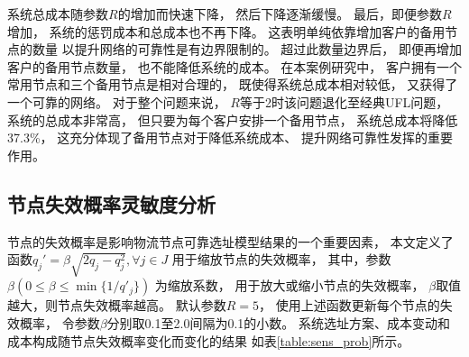   
系统总成本随参数$R$的增加而快速下降，
然后下降逐渐缓慢。
最后，即便参数$R$增加，
系统的惩罚成本和总成本也不再下降。
这表明单纯依靠增加客户的备用节点的数量
以提升网络的可靠性是有边界限制的。
超过此数量边界后，
即便再增加客户的备用节点数量，
也不能降低系统的成本。
在本案例研究中，
客户拥有一个常用节点和三个备用节点是相对合理的，
既使得系统总成本相对较低，
又获得了一个可靠的网络。
对于整个问题来说，
$R$等于2时该问题退化至经典UFL问题，
系统的总成本非常高，
但只要为每个客户安排一个备用节点，
系统总成本将降低37.3\%，
这充分体现了备用节点对于降低系统成本、
提升网络可靠性发挥的重要作用。


\subsection{节点失效概率灵敏度分析}
节点的失效概率是影响物流节点可靠选址模型结果的一个重要因素，
本文定义了函数$q_j' = \beta \sqrt{2q_j - q_j^2},\forall j \in J $
用于缩放节点的失效概率，
其中，参数$\beta (0 \le \beta \le \min \{ 1/q'_j \})$
为缩放系数，
用于放大或缩小节点的失效概率，
$\beta$取值越大，则节点失效概率越高。
默认参数$R=5$，
使用上述函数更新每个节点的失效概率，
令参数$\beta$分别取0.1至2.0间隔为0.1的小数。
系统选址方案、成本变动和成本构成随节点失效概率变化而变化的结果
如表\ref{table:sens_prob}所示。

